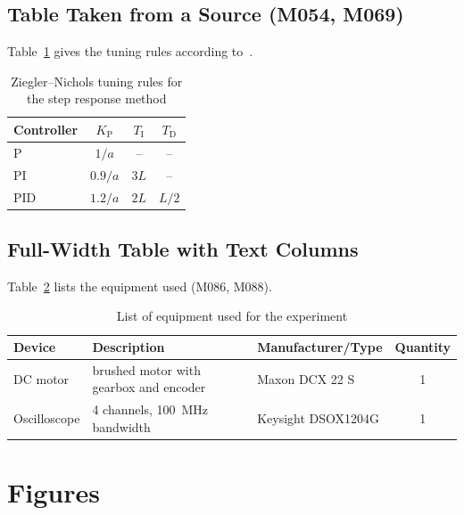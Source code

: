 \documentclass[state=Report]{mcidoc}
\begin{document}
\section{Table Taken from a Source (M054, M069)}
Table~\ref{tab:source} gives the tuning rules according to~\cite{astrom2004}.
\begin{table}[H]
  \centering
  \caption[Ziegler--Nichols tuning rules]{Ziegler--Nichols tuning rules for
    the step response method \cite{astrom2004}}
  \label{tab:source}
  \begin{tabular}{lccc}
    \toprule
    Controller & $K_\mathrm{P}$ & $T_\mathrm{I}$ & $T_\mathrm{D}$ \\
    \midrule
    P   & $1/a$   & --    & --    \\
    PI  & $0.9/a$ & $3L$  & --    \\
    PID & $1.2/a$ & $2L$  & $L/2$ \\
    \bottomrule
  \end{tabular}
\end{table}

\section{Full-Width Table with Text Columns}
Table~\ref{tab:materials} lists the equipment used (M086, M088).
\begin{table}[H]
  \centering
  \caption[List of equipment]{List of equipment used for the experiment}
  \label{tab:materials}
  \begin{tabularx}{\textwidth}{l X l c}
    \toprule
    Device & Description & Manufacturer/Type & Quantity \\
    \midrule
    DC motor     & brushed motor with gearbox and encoder & Maxon DCX 22 S & 1 \\
    Oscilloscope & 4 channels, \qty{100}{\mega\hertz} bandwidth & Keysight DSOX1204G & 1 \\
    \bottomrule
  \end{tabularx}
\end{table}

\chapter{Figures}
\end{document}
